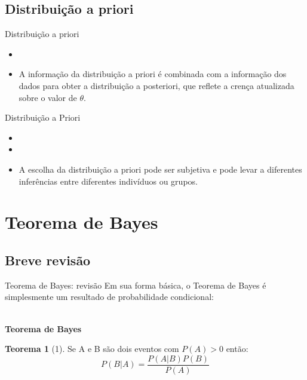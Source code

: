 \documentclass{beamer}
\theoremstyle{definition}
\newtheorem{thm}{Teorema}[section]
\begin{document}
\subsection{Distribuição a priori}
\begin{frame}{Distribuição a priori}
\begin{itemize}
\item {}
\vspace{0.2cm}
\item A informação da distribuição a priori é combinada com a informação dos dados para obter a distribuição a posteriori, que reflete a crença atualizada sobre o valor de $\theta$.
\end{itemize}
\end{frame}
\begin{frame}{Distribuição a Priori}
\begin{itemize}
\item {}
\vspace{0.2cm}
\item {}
\vspace{0.2cm}
\item A escolha da distribuição a priori pode ser subjetiva e pode levar a diferentes inferências entre diferentes indivíduos ou grupos.
\end{itemize}
    
\end{frame}

\section{Teorema de Bayes}
\subsection{Breve revisão}
\begin{frame}{Teorema de Bayes: revisão}
Em sua forma básica, o Teorema de Bayes é simplesmente um resultado de probabilidade
condicional:\\
\

\textbf{Teorema de Bayes}
\begin{thm}[1]
    Se A e B são dois eventos com $P(A)>0$ então:
    $$P(B|A)=\frac{P(A|B)P(B)}{P(A)}$$
\end{thm}
\end{frame}
\end{document}

